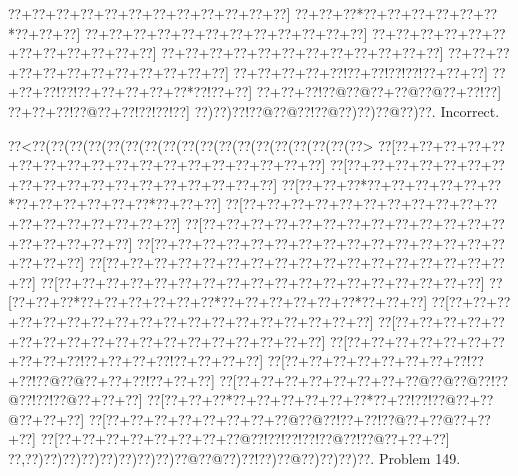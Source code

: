 \documentclass[a5paper]{article}
\begin{document}
\begin{center}
{\goo
\0??+\0??+\0??+\0??+\0??+\0??+\0??+\0??+\0??+\0??+\0??+\0??]
\0??+\0??+\0??*\0??+\0??+\0??+\0??+\0??+\0??*\0??+\0??+\0??]
\0??+\0??+\0??+\0??+\0??+\0??+\0??+\0??+\0??+\0??+\0??+\0??]
\0??+\0??+\0??+\0??+\0??+\0??+\0??+\0??+\0??+\0??+\0??+\0??]
\0??+\0??+\0??+\0??+\0??+\0??+\0??+\0??+\0??+\0??+\0??+\0??]
\0??+\0??+\0??+\0??+\0??+\0??+\0??+\0??+\0??+\0??+\0??+\0??]
\0??+\0??+\0??+\0??+\0??!\0??+\0??!\0??!\0??!\0??+\0??+\0??]
\0??+\0??+\0??!\0??!\0??+\0??+\0??+\0??+\0??*\0??!\0??+\0??]
\0??+\0??+\0??!\0??@\0??@\0??+\0??@\0??@\0??+\0??!\0??]
\0??+\0??+\0??!\0??@\0??+\0??!\0??!\0??!\0??]
\0??)\0??)\0??!\0??@\0??@\0??!\0??@\0??)\0??)\0??@\0??)\0??.
}
Incorrect. 

\end{center}
\newpage
\begin{center}
{\goo
\0??<\0??(\0??(\0??(\0??(\0??(\0??(\0??(\0??(\0??(\0??(\0??(\0??(\0??(\0??(\0??(\0??(\0??(\0??>
\0??[\0??+\0??+\0??+\0??+\0??+\0??+\0??+\0??+\0??+\0??+\0??+\0??+\0??+\0??+\0??+\0??+\0??+\0??]
\0??[\0??+\0??+\0??+\0??+\0??+\0??+\0??+\0??+\0??+\0??+\0??+\0??+\0??+\0??+\0??+\0??+\0??+\0??]
\0??[\0??+\0??+\0??*\0??+\0??+\0??+\0??+\0??+\0??*\0??+\0??+\0??+\0??+\0??+\0??*\0??+\0??+\0??]
\0??[\0??+\0??+\0??+\0??+\0??+\0??+\0??+\0??+\0??+\0??+\0??+\0??+\0??+\0??+\0??+\0??+\0??+\0??]
\0??[\0??+\0??+\0??+\0??+\0??+\0??+\0??+\0??+\0??+\0??+\0??+\0??+\0??+\0??+\0??+\0??+\0??+\0??]
\0??[\0??+\0??+\0??+\0??+\0??+\0??+\0??+\0??+\0??+\0??+\0??+\0??+\0??+\0??+\0??+\0??+\0??+\0??]
\0??[\0??+\0??+\0??+\0??+\0??+\0??+\0??+\0??+\0??+\0??+\0??+\0??+\0??+\0??+\0??+\0??+\0??+\0??]
\0??[\0??+\0??+\0??+\0??+\0??+\0??+\0??+\0??+\0??+\0??+\0??+\0??+\0??+\0??+\0??+\0??+\0??+\0??]
\0??[\0??+\0??+\0??*\0??+\0??+\0??+\0??+\0??+\0??*\0??+\0??+\0??+\0??+\0??+\0??*\0??+\0??+\0??]
\0??[\0??+\0??+\0??+\0??+\0??+\0??+\0??+\0??+\0??+\0??+\0??+\0??+\0??+\0??+\0??+\0??+\0??+\0??]
\0??[\0??+\0??+\0??+\0??+\0??+\0??+\0??+\0??+\0??+\0??+\0??+\0??+\0??+\0??+\0??+\0??+\0??+\0??]
\0??[\0??+\0??+\0??+\0??+\0??+\0??+\0??+\0??+\0??+\0??!\0??+\0??+\0??+\0??!\0??+\0??+\0??+\0??]
\0??[\0??+\0??+\0??+\0??+\0??+\0??+\0??+\0??!\0??+\0??!\0??@\0??@\0??+\0??+\0??!\0??+\0??+\0??]
\0??[\0??+\0??+\0??+\0??+\0??+\0??+\0??+\0??@\0??@\0??@\0??!\0??@\0??!\0??!\0??@\0??+\0??+\0??]
\0??[\0??+\0??+\0??*\0??+\0??+\0??+\0??+\0??+\0??*\0??+\0??!\0??!\0??@\0??+\0??@\0??+\0??+\0??]
\0??[\0??+\0??+\0??+\0??+\0??+\0??+\0??+\0??@\0??@\0??!\0??+\0??!\0??@\0??+\0??@\0??+\0??+\0??]
\0??[\0??+\0??+\0??+\0??+\0??+\0??+\0??+\0??@\0??!\0??!\0??!\0??!\0??@\0??!\0??@\0??+\0??+\0??]
\0??,\0??)\0??)\0??)\0??)\0??)\0??)\0??)\0??)\0??@\0??@\0??)\0??!\0??)\0??@\0??)\0??)\0??)\0??.
}
Problem 149.

\end{center}
\end{document}
